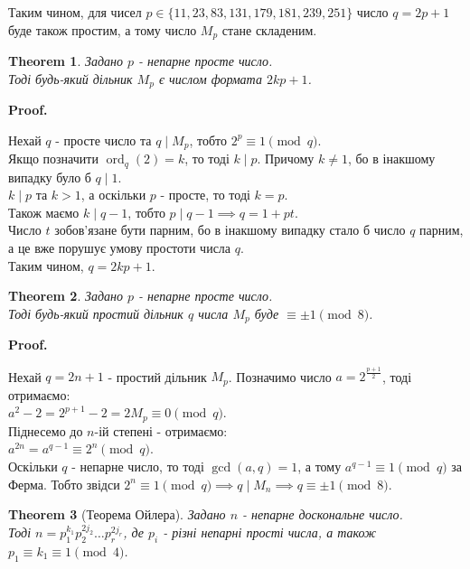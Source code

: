 \documentclass[a4paper, 10pt]{article}
\makeatletter
\theoremstyle{theoremdd}
\newtheorem{theorem}{Theorem}[subsection]
\theoremstyle{theoremdd}
\theoremstyle{theoremdd}
\theoremstyle{theoremdd}
\theoremstyle{theoremdd}
\theoremstyle{theoremdd}
\theoremstyle{theoremdd}
\theoremstyle{theoremdd}
\renewenvironment{proof}[1][Proof.\\]{\par
\pushQED{\hfill \qed}%
\normalfont \topsep6\p@\@plus6\p@\relax
\trivlist
\item\relax
{\bfseries
#1\@addpunct{.}}\hspace\labelsep\ignorespaces
}{%
\popQED\endtrivlist\@endpefalse
}
\DeclareMathOperator{\ord}{ord}
\makeatother
\begin{document}
Таким чином, для чисел $p \in \{11,23,83,131,179,181,239,251\}$ число $q = 2p+1$ буде також простим, а тому число $M_p$ стане складеним.

\begin{theorem}
Задано $p$ - непарне просте число.\\
Тоді будь-який дільник $M_p$ є числом формата $2kp+1$.
\end{theorem}

\begin{proof}
Нехай $q$ - просте число та $q \mid M_p$, тобто $2^p \equiv 1 \pmod q$.\\
Якщо позначити $\ord_q (2) = k$, то тоді $k \mid p$. Причому $k \neq 1$, бо в інакшому випадку було б $q \mid 1$.\\
$k \mid p$ та $k > 1$, а оскільки $p$ - просте, то тоді $k = p$.\\
Також маємо $k \mid q-1$, тобто $p \mid q-1 \implies q = 1 + pt$.\\
Число $t$ зобов'язане бути парним, бо в інакшому випадку стало б число $q$ парним, а це вже порушує умову простоти числа $q$.\\
Таким чином, $q = 2kp+1$.
\end{proof}

\begin{theorem}
Задано $p$ - непарне просте число.\\
Тоді будь-який простий дільник $q$ числа $M_p$ буде $\equiv \pm 1 \pmod 8$.
\end{theorem}

\begin{proof}
Нехай $q = 2n+1$ - простий дільник $M_p$. Позначимо число $a = 2^{\frac{p+1}{2}}$, тоді отримаємо:\\
$a^2 - 2 = 2^{p+1}-2 = 2M_p \equiv 0 \pmod q$.\\
Піднесемо до $n$-ій степені - отримаємо:\\
$a^{2n} = a^{q-1} \equiv 2^n \pmod q$.\\
Оскільки $q$ - непарне число, то тоді $\gcd(a,q) = 1$, а тому $a^{q-1} \equiv 1 \pmod q$ за Ферма. Тобто звідси $2^n \equiv 1 \pmod q \implies q \mid M_n \implies q \equiv \pm 1 \pmod 8$.
\end{proof}

\begin{theorem}[Теорема Ойлера]
Задано $n$ - непарне доскональне число.\\
Тоді $n = p_1^{k_1} p_2^{2j_2} \dots p_r^{2j_r}$, де $p_i$ - різні непарні прості числа, а також $p_1 \equiv k_1 \equiv 1 \pmod 4$.
\end{theorem}
\end{document}
